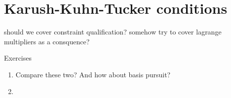 \chapter{Karush-Kuhn-Tucker conditions}
\label{chap:kkt}


should we cover constraint qualification? 
somehow try to cover lagrange multipliers as a consquence?

\begin{xcb}{Exercises}
\begin{enumerate}[label=\thechapter.\arabic*]
\settowidth{\leftmargini}{00.00.\hskip\labelsep}
\item \label{ex:lasso_dantzig}
Compare these two? And how about basis pursuit?

\item \label{ex:simplex_projection}

\end{enumerate}
\end{xcb}